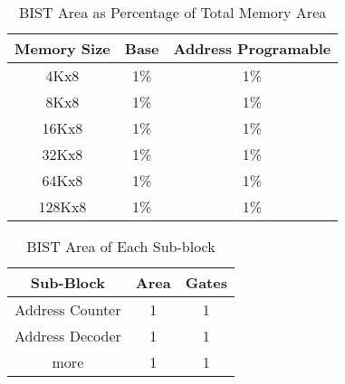 \begin{table}[ht]
\caption{BIST Area as Percentage of Total Memory Area}
\centering
\begin{tabular}{c c c}
\hline\hline
Memory Size & Base & Address Programable \\ [0.5ex]

\hline
4Kx8        & 1\% & 1\%  \\
8Kx8        & 1\% & 1\%  \\
16Kx8        & 1\% & 1\%  \\
32Kx8        & 1\% & 1\%  \\
64Kx8        & 1\% & 1\%  \\
128Kx8        & 1\% & 1\%  \\ [1ex]
\end{tabular}
\label{table:area_percentage}
\end{table}

\begin{table}[ht]
\caption{BIST Area of Each Sub-block}
\centering
\begin{tabular}{c c c}
\hline\hline
Sub-Block  &  Area  & Gates \\ [0.5ex]

\hline
Address Counter  &  1  &  1 \\
Address Decoder  &  1  &  1 \\
more             &  1  &  1 \\ [1ex]
\end{tabular}
\label{table:sub_block_area}
\end{table}

  
